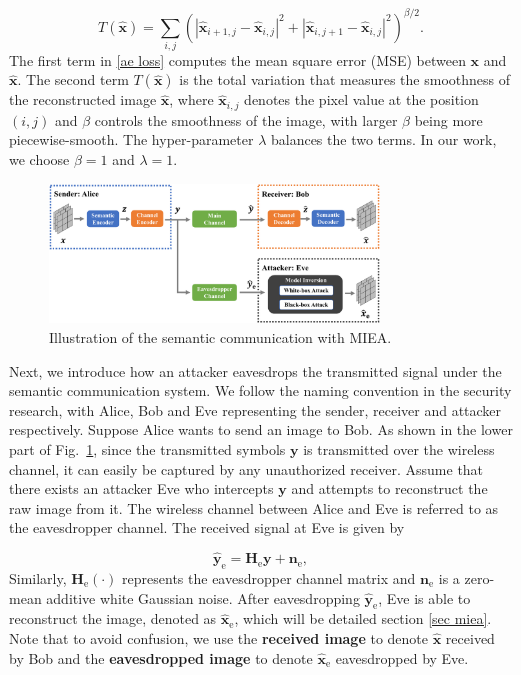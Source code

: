 \documentclass[conference]{IEEEtran}
\begin{document}
\begin{equation}
T(\hat{\boldsymbol{x}}) = \sum\limits_{i, j}(|\hat{\boldsymbol{x}}_{i+1,j} - \hat{\boldsymbol{x}}_{i,j}|^2 + |\hat{\boldsymbol{x}}_{i,j+1} - \hat{\boldsymbol{x}}_{i,j}|^2)^{\beta/2}. 
\label{tv loss}	
\end{equation}
\noindent The first term in \eqref{ae loss} computes the mean square error (MSE) between $\boldsymbol{x}$ and $\hat{\boldsymbol{x}}$. The second term $T(\hat{\boldsymbol{x}})$ is the total variation \cite{rudin1992nonlinear} that measures the smoothness of the reconstructed image $\hat{\boldsymbol{x}}$, where $\hat{\boldsymbol{x}}_{i, j}$ denotes the pixel value at the position $(i,j)$ and $\beta$ controls the smoothness of the image, with larger $\beta$ being more piecewise-smooth. The hyper-parameter $\lambda$ balances the two terms. In our work, we choose $\beta = 1$ and $\lambda = 1$.

\begin{figure}[htbp]
\centering
   \includegraphics[width=3.45in]{figures/system_model.pdf}
\caption{Illustration of the semantic communication with MIEA.}
\label{system model}
\end{figure}

Next, we introduce how an attacker eavesdrops the transmitted signal under the semantic communication system. We follow the naming convention in the security research, with Alice, Bob and Eve representing the sender, receiver and attacker respectively. Suppose Alice wants to send an image to Bob. As shown in the lower part of Fig.~\ref{system model}, since the transmitted symbols $\boldsymbol{y}$ is transmitted over the wireless channel, it can easily be captured by any unauthorized receiver. Assume that there exists an attacker Eve who intercepts $\boldsymbol{y}$ and attempts to reconstruct the raw image from it. The wireless channel between Alice and Eve is referred to as the eavesdropper channel\cite{mukherjee2014principles}. The received signal at Eve is given by 

\begin{equation}
	\hat{\boldsymbol{y}}_\mathrm{e} = \boldsymbol{H}_\mathrm{e}\boldsymbol{y} + \boldsymbol{n}_\mathrm{e},
\end{equation}
Similarly, $\boldsymbol{H}_\mathrm{e}(\boldsymbol{\cdot})$ represents the eavesdropper channel matrix and $\boldsymbol{n}_\mathrm{e}$ is a zero-mean additive white Gaussian noise. After eavesdropping $\hat{\boldsymbol{y}}_\mathrm{e}$, Eve is able to reconstruct the image, denoted as $\hat{\boldsymbol{x}}_\mathrm{e}$, which will be detailed section \ref{sec miea}. Note that to avoid confusion, we use the \textbf{received image} to denote $\hat{\boldsymbol{x}}$ received by Bob and the \textbf{eavesdropped image} to denote $\hat{\boldsymbol{x}}_{\mathrm{e}}$ eavesdropped by Eve.
\end{document}
